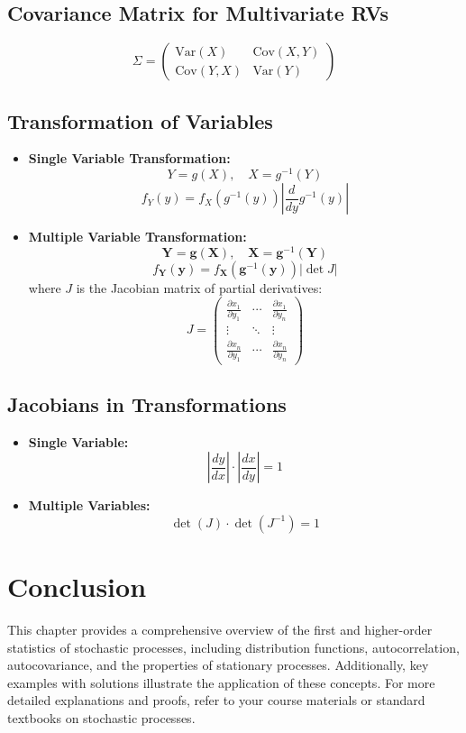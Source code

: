 \documentclass[12pt]{article}
\begin{document}
\subsection{Covariance Matrix for Multivariate RVs}
\[
\Sigma = 
\begin{pmatrix}
\text{Var}(X) & \text{Cov}(X,Y) \\
\text{Cov}(Y,X) & \text{Var}(Y)
\end{pmatrix}
\]

\subsection{Transformation of Variables}
\begin{itemize}
    \item \textbf{Single Variable Transformation:}
    \[
    Y = g(X), \quad X = g^{-1}(Y)
    \]
    \[
    f_Y(y) = f_X(g^{-1}(y)) \left| \frac{d}{dy} g^{-1}(y) \right|
    \]
    \item \textbf{Multiple Variable Transformation:}
    \[
    \mathbf{Y} = \mathbf{g}(\mathbf{X}), \quad \mathbf{X} = \mathbf{g}^{-1}(\mathbf{Y})
    \]
    \[
    f_{\mathbf{Y}}(\mathbf{y}) = f_{\mathbf{X}}(\mathbf{g}^{-1}(\mathbf{y})) \left| \det J \right|
    \]
    where \( J \) is the Jacobian matrix of partial derivatives:
    \[
    J = 
    \begin{pmatrix}
    \frac{\partial x_1}{\partial y_1} & \cdots & \frac{\partial x_1}{\partial y_n} \\
    \vdots & \ddots & \vdots \\
    \frac{\partial x_n}{\partial y_1} & \cdots & \frac{\partial x_n}{\partial y_n}
    \end{pmatrix}
    \]
\end{itemize}

\subsection{Jacobians in Transformations}
\begin{itemize}
    \item \textbf{Single Variable:}
    \[
    \left| \frac{dy}{dx} \right| \cdot \left| \frac{dx}{dy} \right| = 1
    \]
    \item \textbf{Multiple Variables:}
    \[
    \det(J) \cdot \det(J^{-1}) = 1
    \]
\end{itemize}

\section{Conclusion}
This chapter provides a comprehensive overview of the first and higher-order statistics of stochastic processes, including distribution functions, autocorrelation, autocovariance, and the properties of stationary processes. Additionally, key examples with solutions illustrate the application of these concepts. For more detailed explanations and proofs, refer to your course materials or standard textbooks on stochastic processes.
\end{document}

